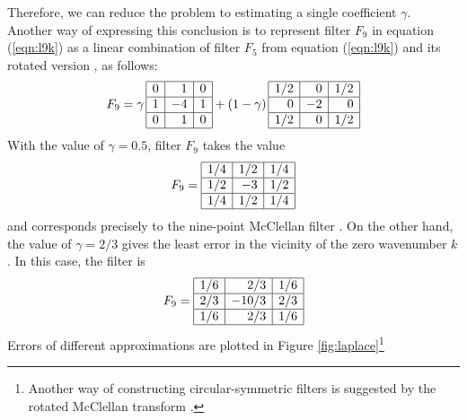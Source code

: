 Therefore, we can reduce the problem to estimating a single
coefficient $\gamma$. Another way of expressing this conclusion is to
represent filter $F_9$ in equation (\ref{eqn:l9k}) as a linear
combination of filter $F_5$ from equation (\ref{eqn:l9k}) and its
rotated version \cite[]{cole}, as follows:
\begin{equation}
\label{eqn:new2}
F_9 = \gamma\, 
\begin{array}{|r|r|r|}
\hline
0 & 1 & 0 \\ \hline
1 & -4  & 1 \\ \hline
0 & 1 & 0  \\ \hline 
\end{array}
+ (1-\gamma)\,
\begin{array}{|r|r|r|}
\hline
1/2 & 0 & 1/2 \\ \hline
0 & -2  & 0 \\ \hline
1/2 & 0 & 1/2  \\ \hline 
\end{array}
\end{equation}
With the value of $\gamma=0.5$, filter $F_9$ takes the value
\begin{equation}
\label{eqn:mc}
F_9 = \begin{array}{|r|r|r|}
\hline
1/4 & 1/2 & 1/4 \\ \hline
1/2 & -3 & 1/2 \\ \hline
1/4 & 1/2 & 1/4  \\ \hline 
\end{array}
\end{equation}
and corresponds precisely to the nine-point McClellan filter
\cite[]{mc,GEO56-11-17781785}. On the other hand, the value of
$\gamma=2/3$ gives the least error in the vicinity of the zero
wavenumber $k$. In this case, the filter is
\begin{equation}
\label{eqn:my}
F_9 = \begin{array}{|r|r|r|}
\hline
1/6 & 2/3 & 1/6 \\ \hline
2/3 & -10/3 & 2/3 \\ \hline
1/6 & 2/3 & 1/6  \\ \hline 
\end{array}
\end{equation}
Errors of different approximations are plotted in Figure
\ref{fig:laplace}\footnote{Another way of constructing
  circular-symmetric filters is suggested by the rotated McClellan
  transform \cite[]{Biondi.sep.77.27}.}

\par

